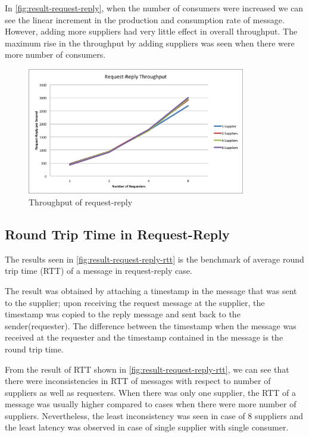   In \autoref{fig:result-request-reply}, when the number of consumers were increased we can see the linear increment in the production and consumption rate of message. However, adding more suppliers had very little effect in overall throughput. The maximum rise in the throughput by adding suppliers was seen when there were more number of consumers.
\begin{figure}[H]
  \centering
  \includegraphics[width=0.85\textwidth]{figures/09request-reply}
  \caption[Throughput of request-reply]{Throughput of request-reply}
  \label{fig:result-request-reply}
\end{figure}

\subsection{Round Trip Time in Request-Reply}
\label{subsec:request-reply-rtt}
  The results seen in \autoref{fig:result-request-reply-rtt} is the benchmark of average round trip time (RTT) of a message in request-reply case.

  The result was obtained by attaching a timestamp in the message that was sent to the supplier; upon receiving the request message at the supplier, the timestamp was copied to the reply message and sent back to the sender(requester). The difference between the timestamp when the message was received at the requester and the timestamp contained in the message is the round trip time.

  From the result of RTT shown in \autoref{fig:result-request-reply-rtt}, we can see that there were inconsistencies in RTT of messages with respect to number of suppliers as well as requesters. When there was only one supplier, the RTT of a message was usually higher compared to cases when there were more number of suppliers. Nevertheless, the least inconsistency was seen in case of 8 suppliers and the least latency was observed in case of single supplier with single consumer.

